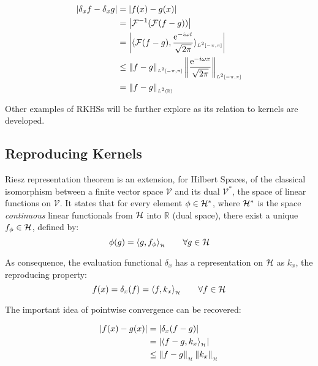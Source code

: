 \begin{subequations}
\begin{align}
\left|\delta_x f-\delta_x g\right| &= \left|f(x)-g(x)\right|\\
			  &=\left| \mathcal{F}^{-1}(\mathcal{F}(f-g)) \right|\\
			  &=\left| \langle \mathcal{F}(f-g),\frac{\mathrm{e}^{-i\omega
			  t}}{\sqrt{2\pi}}\rangle_{\scriptscriptstyle L^2[-\pi,\pi]} \right| \label{eq:cont_four}
			  \\
			  &\leq
			  \left\lVert f-g\right\rVert_{\scriptscriptstyle
			  L^2[-\pi,\pi]}\left\lVert\frac{\mathrm{e}^{-i\omega x}}{\sqrt{2\pi}}\right\rVert_{\scriptscriptstyle L^2[-\pi,\pi]} \label{eq:cont_cs} \\
			  &= \left\lVert f-g\right\rVert_{\scriptscriptstyle L^2(\mathbb{R})} \label{eq:cont_par}
\end{align}
\end{subequations}

Other examples of RKHSs will be further explore as its relation to kernels are
developed.

\subsection{Reproducing Kernels}

Riesz representation theorem is an extension, for Hilbert Spaces, of the
classical isomorphism between a finite vector space $\mathcal{V}$ and its dual
$\mathcal{V}^*$, the space of linear functions on $\mathcal{V}$. It states that
for every element $\phi \in \mathcal{H}^*$, where $\mathcal{H}^*$ is the space
\textit{continuous} linear functionals from $\mathcal{H}$ into $\mathbb{R}$ (dual
space), there exist a unique $f_\phi \in \mathcal{H}$, defined by:
\begin{equation*}
\phi(g)= \langle g,f_\phi\rangle_{_{\mathcal{H}}}\qquad \forall g \in \mathcal{H}
\end{equation*}

As consequence, the evaluation functional \(\delta_x\) has a representation on
\(\mathcal{H}\) as \(k_x\), the reproducing property:
\begin{equation*}
f(x) = \delta_x(f) = \langle f,k_x\rangle_{_{\mathcal{H}}}\qquad \forall f \in \mathcal{H}
\end{equation*}

The important idea of pointwise convergence can be recovered:

\begin{subequations}
\begin{align}
\left|f(x)-g(x)\right| &= \left|\delta_x(f-g)\right|\\
			  &= \left|\langle f-g,k_x\rangle_{_{\mathcal{H}}}\right|\\
			  &\leq \left\lVert f-g\right\rVert_{_{\mathcal{H}}}\left\lVert k_x\right\rVert_{_{\mathcal{H}}}\label{eq:pw_cs_ineq}
\end{align}
\end{subequations}

